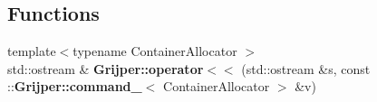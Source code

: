 \subsection*{Functions}
\begin{DoxyCompactItemize}
\item 
{\footnotesize template$<$typename Container\-Allocator $>$ }\\std\-::ostream \& {\bf Grijper\-::operator$<$$<$} (std\-::ostream \&s, const \-::{\bf Grijper\-::command\-\_\-}$<$ Container\-Allocator $>$ \&v)
\end{DoxyCompactItemize}
